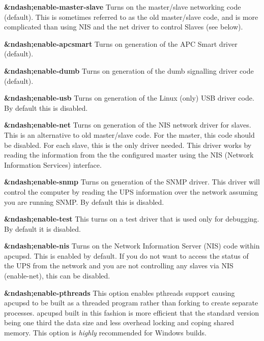 \begin{description}
\item {\bf \&ndash;enable-master-slave}
Turns on the master/slave networking code (default). This is sometimes
referred to as the old master/slave code, and is more complicated than using
NIS and the net driver to control Slaves (see below).  

\item {\bf \&ndash;enable-apcsmart}
Turns on generation of the APC Smart driver (default).  

\item {\bf \&ndash;enable-dumb}
Turns on generation of the dumb signalling driver code (default).  

\item {\bf \&ndash;enable-usb}
Turns on generation of the Linux (only) USB driver code. By default this is
disabled.  

\item {\bf \&ndash;enable-net}
Turns on generation of the NIS network driver for slaves. This is an
alternative to old master/slave code. For the master, this code should be
disabled. For each slave, this is the only driver needed. This driver works by
reading the information from the the configured master using the NIS (Network
Information Services) interface.  

\item {\bf \&ndash;enable-snmp}
Turns on generation of the SNMP driver. This driver will control the computer
by reading the UPS information over the network assuming you are running SNMP.
By default this is disabled.  

\item {\bf \&ndash;enable-test}
This turns on a test driver that is used only for debugging. By default it is
disabled.  

\item {\bf \&ndash;enable-nis}
Turns on the Network Information Server (NIS) code within apcupsd. This is
enabled by default. If you do not want to access the status of the UPS from
the network and you are not controlling any slaves via NIS (enable-net), this
can be disabled.  

\item {\bf \&ndash;enable-pthreads}
This option enables pthreads support causing apcupsd to be built as a threaded
program rather than forking to create separate processes. apcupsd built in
this fashion is more efficient that the standard version being one third the
data size and less overhead locking and coping shared memory. This option is
{\it highly} recommended for Windows builds.  


\end{description}
